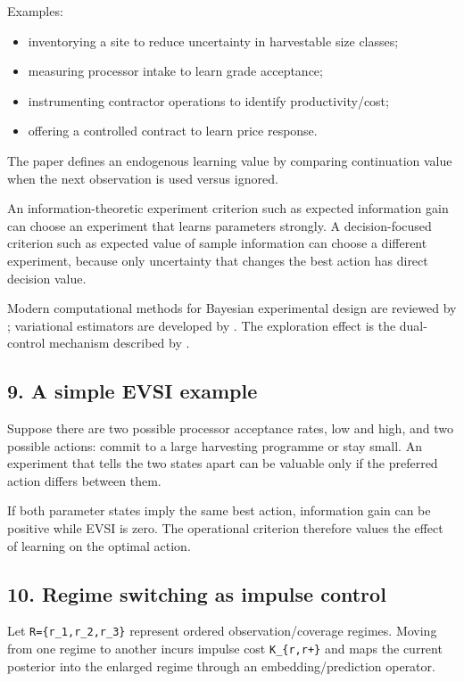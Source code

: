 Examples:

\begin{itemize}
\tightlist
\item
  inventorying a site to reduce uncertainty in harvestable size classes;
\item
  measuring processor intake to learn grade acceptance;
\item
  instrumenting contractor operations to identify productivity/cost;
\item
  offering a controlled contract to learn price response.
\end{itemize}

The paper defines an endogenous learning value by comparing continuation value
when the next observation is used versus ignored.

An information-theoretic experiment criterion such as expected information gain
can choose an experiment that learns parameters strongly. A decision-focused
criterion such as expected value of sample information can choose a different
experiment, because only uncertainty that changes the best action has direct
decision value.

Modern computational methods for Bayesian experimental design are reviewed by
\citet{rainforth2024bed}; variational estimators are developed by
\citet{foster2019boed}. The exploration effect is the dual-control mechanism
described by \citet{meijer2026dual}.

\subsection{9. A simple EVSI example}\label{a-simple-evsi-example}

Suppose there are two possible processor acceptance rates, low and high, and two
possible actions: commit to a large harvesting programme or stay small. An
experiment that tells the two states apart can be valuable only if the preferred
action differs between them.

If both parameter states imply the same best action, information gain can be
positive while EVSI is zero. The operational criterion therefore values the
effect of learning on the optimal action.

\subsection{10. Regime switching as impulse control}\label{regime-switching-as-impulse-control}

Let \texttt{R=\{r\_1,r\_2,r\_3\}} represent ordered observation/coverage regimes. Moving from
one regime to another incurs impulse cost \texttt{K\_\{r,r+\}} and maps the current
posterior into the enlarged regime through an embedding/prediction operator.

